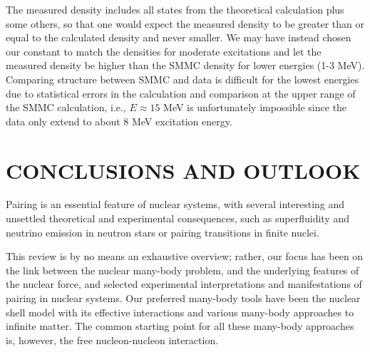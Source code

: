 \documentclass[rmp,aps,floatfix]{revtex4}
\begin{document}
The measured density includes all states
from the theoretical calculation plus some others, so that one
would expect the measured density to be greater than or equal to the
calculated density and never smaller.  We may have instead chosen our
constant to match the densities for moderate excitations and let the
measured density be higher than the SMMC density for lower energies
(1-3 MeV). Comparing structure between SMMC and data is difficult
for the lowest energies due to statistical errors in the calculation
and comparison at the upper range of the SMMC calculation, i.e.,
$E\approx15$ MeV is unfortunately impossible since the data only
extend to about $8$ MeV excitation energy.



%

\section{CONCLUSIONS AND OUTLOOK}
\label{sec:conclusion}

Pairing is an essential feature of nuclear systems, with 
several interesting and unsettled theoretical and experimental   
consequences, such  as superfluidity and neutrino
emission in neutron stars or pairing transitions in finite nuclei.

This review is by no means an exhaustive overview; rather, our focus has been
on the link between the nuclear many-body problem, and the underlying 
features of the nuclear force, and selected experimental interpretations
and manifestations of pairing in nuclear systems. 
Our preferred many-body tools have been  the   
nuclear shell model with its  effective interactions 
and various many-body approaches to infinite matter. The common starting 
point for all these
many-body approaches is, however, the free nucleon-nucleon interaction.
\end{document}
